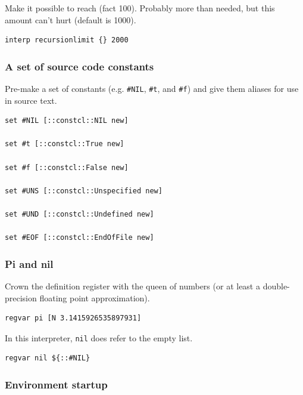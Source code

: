 \documentclass[twoside]{report}
\begin{document}
Make it possible to reach (fact 100). Probably more than needed, but this amount can't hurt (default is 1000).

\begin{lstlisting}
interp recursionlimit {} 2000
\end{lstlisting}

\subsubsection{A set of source code constants}
\label{a-set-of-source-code-constants}

Pre-make a set of constants (e.g. \texttt{\#NIL}, \texttt{\#t}, and \texttt{\#f}) and give them aliases for use in source text.

\begin{lstlisting}
set #NIL [::constcl::NIL new]

set #t [::constcl::True new]

set #f [::constcl::False new]

set #UNS [::constcl::Unspecified new]

set #UND [::constcl::Undefined new]

set #EOF [::constcl::EndOfFile new]
\end{lstlisting}

\subsubsection{Pi and nil}
\label{pi-and-nil}

Crown the definition register with the queen of numbers (or at least a double-precision floating point approximation).

\begin{lstlisting}
regvar pi [N 3.1415926535897931]
\end{lstlisting}

In this interpreter, \texttt{nil} does refer to the empty list.

\begin{lstlisting}
regvar nil ${::#NIL}
\end{lstlisting}

\subsubsection{Environment startup}
\label{environment-startup}
\end{document}
